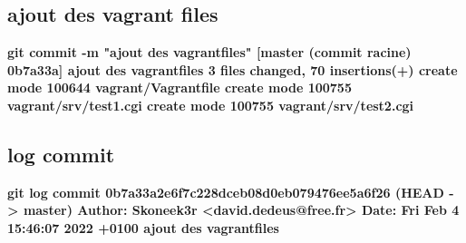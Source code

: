 \documentclass{report}
\begin{document}
\subsection{ajout des vagrant files}
\textbf{git commit -m "ajout des vagrantfiles"
[master (commit racine) 0b7a33a] ajout des vagrantfiles
 3 files changed, 70 insertions(+)
 create mode 100644 vagrant/Vagrantfile
 create mode 100755 vagrant/srv/test1.cgi
 create mode 100755 vagrant/srv/test2.cgi}

\subsection{log commit}
\textbf{git log commit 0b7a33a2e6f7c228dceb08d0eb079476ee5a6f26 (HEAD -> master)
Author: Skoneek3r <david.dedeus@free.fr>
Date:   Fri Feb 4 15:46:07 2022 +0100 ajout des vagrantfiles}
\end{document}
